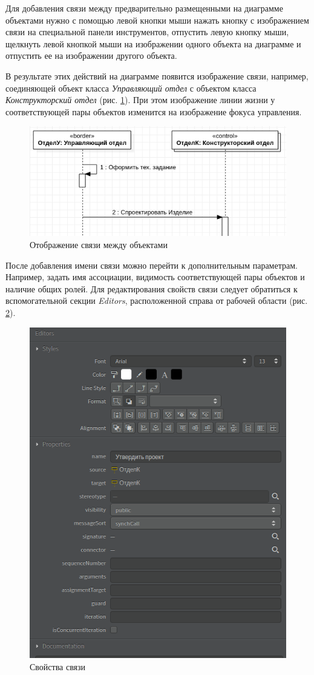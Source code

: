 \documentclass[a4paper,12pt]{report}
\begin{document}
Для добавления связи между предварительно размещенными на диаграмме объектами нужно с помощью левой кнопки мыши нажать кнопку с изображением связи на специальной панели инструментов, отпустить левую кнопку мыши, щелкнуть левой кнопкой мыши на изображении одного объекта на диаграмме и отпустить ее на изображении другого объекта. 

В результате этих действий на диаграмме появится изображение связи, например, соединяющей объект класса \textit{Управляющий отдел} с объектом класса \textit{Конструкторский отдел} (рис. \ref{fig:sequenceaction1}). При этом изображение линии жизни у соответствующей пары объектов изменится на изображение фокуса управления.

\begin{figure}[h!]
	\centering
	\includegraphics[width=0.7\linewidth]{images/sequenceaction1}
	\caption{Отображение связи между объектами}
	\label{fig:sequenceaction1}
\end{figure}

После добавления имени связи можно перейти к дополнительным параметрам. Например, задать имя ассоциации, видимость соответствующей пары объектов и наличие общих ролей. Для редактирования свойств связи следует обратиться к вспомогательной секции \textit{Editors}, расположенной справа от рабочей области (рис. \ref{fig:sequenceeditors}).

\begin{figure}[h!]
	\centering
	\includegraphics[width=0.5\linewidth]{images/sequenceeditors}
	\caption{Свойства связи}
	\label{fig:sequenceeditors}
\end{figure}
\end{document}
